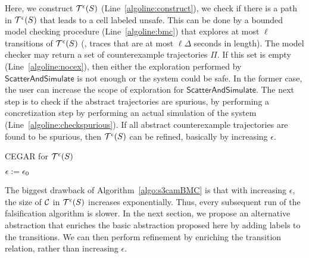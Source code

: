 Here, we construct $\mathcal{T}^{\epsilon}(S)$
(Line~\ref{algoline:construct}), we check if there is a path in
$\mathcal{T}^{\epsilon}(S)$ that leads to a cell labeled
unsafe. This can be done by a bounded model checking procedure
(Line~\ref{algoline:bmc}) that explores at most $\ell$ transitions of
$\mathcal{T}^{\epsilon}(S)$ (\ie, traces that are at most
$\ell\Delta$ seconds in length). The model checker may return a set of
counterexample trajectories $\Pi$. If this set is empty
(Line~\ref{algoline:nocex}), then either the exploration performed by
$\mathsf{ScatterAndSimulate}$ is not enough or the system could be
safe. In the former case, the user can increase the scope of
exploration for $\mathsf{ScatterAndSimulate}$.  The next step is to
check if the abstract trajectories are spurious, by performing a
concretization step by performing an actual simulation of the system
(Line~\ref{algoline:checkspurious}). If all abstract counterexample
trajectories are found to be spurious, then
$\mathcal{T}^{\epsilon}(S)$ can be refined, basically by
increasing $\epsilon$.
\begin{algorithm}[t]
\DontPrintSemicolon
\caption{CEGAR for $\mathcal{T}^{\epsilon}(S)$\label{algo:s3camBMC}}
$\epsilon := \epsilon_0$ \;
\end{algorithm}

The biggest drawback of Algorithm~\ref{algo:s3camBMC} is that with
increasing $\epsilon$, the size of $\mathcal{C}$ in
$\mathcal{T}^{\epsilon}(S)$ increases exponentially.  Thus,
every subsequent run of the falsification algorithm is slower. In the
next section, we propose an alternative abstraction that enriches the
basic abstraction proposed here by adding labels to the transitions.
We can then perform refinement by enriching the transition relation,
rather than increasing $\epsilon$.

